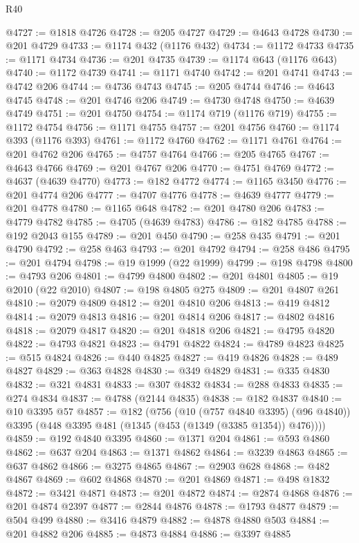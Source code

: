 \begin{lexlean}{R40}
\begin{coremodule}
@4727 := @1818 @4726
@4728 := @205 @4727
@4729 := @4643 @4728
@4730 := @201 @4729
@4733 := @1174 @432 (@1176 @432)
@4734 := @1172 @4733
@4735 := @1171 @4734
@4736 := @201 @4735
@4739 := @1174 @643 (@1176 @643)
@4740 := @1172 @4739
@4741 := @1171 @4740
@4742 := @201 @4741
@4743 := @4742 @206
@4744 := @4736 @4743
@4745 := @205 @4744
@4746 := @4643 @4745
@4748 := @201 @4746 @206
@4749 := @4730 @4748
@4750 := @4639 @4749
@4751 := @201 @4750
@4754 := @1174 @719 (@1176 @719)
@4755 := @1172 @4754
@4756 := @1171 @4755
@4757 := @201 @4756
@4760 := @1174 @393 (@1176 @393)
@4761 := @1172 @4760
@4762 := @1171 @4761
@4764 := @201 @4762 @206
@4765 := @4757 @4764
@4766 := @205 @4765
@4767 := @4643 @4766
@4769 := @201 @4767 @206
@4770 := @4751 @4769
@4772 := @4637 (@4639 @4770)
@4773 := @182 @4772
@4774 := @1165 @3450
@4776 := @201 @4774 @206
@4777 := @4707 @4776
@4778 := @4639 @4777
@4779 := @201 @4778
@4780 := @1165 @648
@4782 := @201 @4780 @206
@4783 := @4779 @4782
@4785 := @4705 (@4639 @4783)
@4786 := @182 @4785
@4788 := @192 @2043 @155
@4789 := @201 @450
@4790 := @258 @435
@4791 := @201 @4790
@4792 := @258 @463
@4793 := @201 @4792
@4794 := @258 @486
@4795 := @201 @4794
@4798 := @19 @1999 (@22 @1999)
@4799 := @198 @4798
@4800 := @4793 @206
@4801 := @4799 @4800
@4802 := @201 @4801
@4805 := @19 @2010 (@22 @2010)
@4807 := @198 @4805 @275
@4809 := @201 @4807 @261
@4810 := @2079 @4809
@4812 := @201 @4810 @206
@4813 := @419 @4812
@4814 := @2079 @4813
@4816 := @201 @4814 @206
@4817 := @4802 @4816
@4818 := @2079 @4817
@4820 := @201 @4818 @206
@4821 := @4795 @4820
@4822 := @4793 @4821
@4823 := @4791 @4822
@4824 := @4789 @4823
@4825 := @515 @4824
@4826 := @440 @4825
@4827 := @419 @4826
@4828 := @489 @4827
@4829 := @363 @4828
@4830 := @349 @4829
@4831 := @335 @4830
@4832 := @321 @4831
@4833 := @307 @4832
@4834 := @288 @4833
@4835 := @274 @4834
@4837 := @4788 (@2144 @4835)
@4838 := @182 @4837
@4840 := @10 @3395 @57
@4857 := @182
    (@756
      (@10 (@757 @4840 @3395) (@96 @4840))
      @3395
      (@448 @3395 @481 (@1345 (@453 (@1349 (@3385 @1354)) @476))))
@4859 := @192 @4840 @3395
@4860 := @1371 @204
@4861 := @593 @4860
@4862 := @637 @204
@4863 := @1371 @4862
@4864 := @3239 @4863
@4865 := @637 @4862
@4866 := @3275 @4865
@4867 := @2903 @628
@4868 := @482 @4867
@4869 := @602 @4868
@4870 := @201 @4869
@4871 := @498 @1832
@4872 := @3421 @4871
@4873 := @201 @4872
@4874 := @2874 @4868
@4876 := @201 @4874 @2397
@4877 := @2844 @4876
@4878 := @1793 @4877
@4879 := @504 @499
@4880 := @3416 @4879
@4882 := @4878 @4880 @503
@4884 := @201 @4882 @206
@4885 := @4873 @4884
@4886 := @3397 @4885

\end{coremodule}
\end{lexlean}
